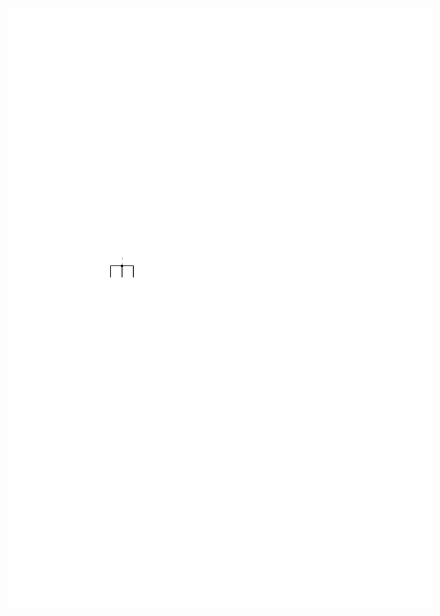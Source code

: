 \documentclass[a4paper]{scrreprt}
\theoremstyle{definition}
\begin{document}
\begin{figure}[h]
            {\includegraphics[scale=.8]{oc3_embed/incoming/indeg3}}
        \quad

\end{figure}
\end{document}

